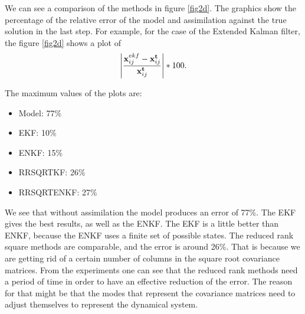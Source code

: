\documentclass[12pt]{article}
\begin{document}
We can see a comparison of the methods in figure \ref{fig2d}. The graphics show the percentage of the relative error of the model and assimilation against the true solution in the last step. For example, for the case of the Extended Kalman filter, the figure \ref{fig2d} shows a plot of
\begin{eqnarray}
\left| \frac{ {\bf x}_{ij}^{ekf} - {\bf x}_{ij}^{\bf t} } { {\bf x}_{ij}^{\bf t} } \right| * 100.
\end{eqnarray}

 The maximum values of the plots are:
\begin{itemize}
\item Model: 77\%
\item EKF: 10\%
\item ENKF: 15\%
\item RRSQRTKF: 26\%
\item RRSQRTENKF: 27\%
\end{itemize}
We see that without assimilation the model produces an error of 77\%. The EKF gives the best results, as well as the ENKF. The EKF is a little better than ENKF, because the ENKF uses a finite set of possible states. The reduced rank square methods are comparable, and the error is around 26\%. That is because we are getting rid of a certain number of columns in the square root covariance matrices. From the experiments one can see that the reduced rank methods need a period of time in order to have an effective reduction of the error. The reason for that might be that the modes that represent the covariance matrices need to adjust themselves to represent the dynamical system. 
\end{document}
